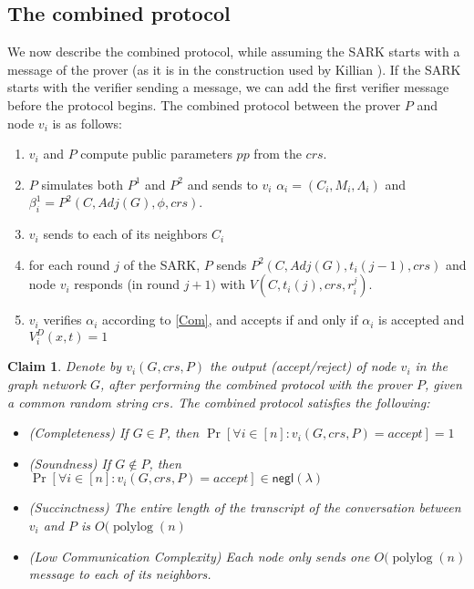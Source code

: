 \documentclass{llncs}
\numberwithin{equation}{section}
\numberwithin{figure}{section}
\newtheorem{claim}[theorem]{Claim}
\theoremstyle{definition}
\newcommand{\polylog}{\operatorname{polylog}}
\newcommand{\negl}{\mathsf{negl}}
\begin{document}
\subsection{The combined protocol}
We now describe the combined protocol, while assuming the SARK starts with a message of the prover (as it is in the construction used by Killian \cite{kilian1992note}). If the SARK starts with the verifier sending a message, we can add the first verifier message before the protocol begins.
The combined protocol between the prover $P$ and node $v_i$ is as follows:
\begin{enumerate}
    \item $v_i$ and $P$ compute public parameters $pp$ from the $crs$.
    \item $P$ simulates both $P^1$ and $P^2$ and sends to $v_i$ $\alpha_i = (C_i, M_i, \Lambda_i)$ and $\beta_i^1 = P^2(C, Adj(G), \phi, crs)$.
    \item $v_i$ sends to each of its neighbors $C_i$
    \item for each round $j$ of the SARK, $P$ sends $P^2(C, Adj(G), t_i(j-1), crs)$ and node $v_i$ responds (in round $j+1)$ with $V(C, t_i(j), crs, r_i^j)$.
    \item $v_i$ verifies $\alpha_i$ according to \ref{Com}, and accepts if and only if $\alpha_i$ is accepted and $V_i^D(x,t)=1$
\end{enumerate}

\begin{claim}
    Denote by $v_i(G, crs, P)$ the output (accept/reject) of node $v_i$ in the graph network $G$, after performing the combined protocol with the prover $P$, given a common random string $crs$. The combined protocol satisfies the following:
    \begin{itemize}
        \item (\emph{Completeness}) If $G\in P$, then $\Pr[\forall i\in [n]: v_i(G, crs, P) = accept] = 1$
        \item (\emph{Soundness}) If $G\notin P$, then $\Pr[\forall i\in [n]: v_i(G, crs, P) = accept] \in \negl(\lambda)$
        \item (\emph{Succinctness}) The entire length of the transcript of the conversation between $v_i$ and $P$ is $O(\polylog(n)$
        \item (\emph{Low Communication Complexity}) Each node only sends one $O(\polylog (n)$ message to each of its neighbors.
    \end{itemize}
\end{claim}
\end{document}
